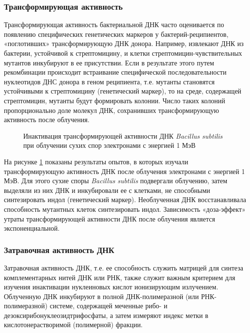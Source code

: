 \documentclass[a4paper, 14pt]{article}
\begin{document}
\subsubsection{Трансформирующая активность}
Трансформирующая активность бактериальной ДНК часто оценивается по
появлению специфических генетических маркеров у бактерий-реципиентов,
«поглотивших» трансформирующую ДНК донора. Например, извлекают ДНК из
бактерии, устойчивой к стрептомицину, и клетки стрептомицин-чувствительных
мутантов инкубируют в ее присутствии. Если в результате этого путем рекомбинации
происходит встраивание специфической последовательности нуклеотидов ДНС
донора в геном реципиента, т.е. мутанты становятся устойчивыми к стрептомицину
(генетический маркер), то на среде, содержащей стрептомицин, мутанты будут
формировать колонии. Число таких колоний пропорционально доле молекул ДНК,
сохранивших трансформирующую активность после облучения.
\begin{figure}[htbp]
    \centering
    \caption{Инактивация трансформирующей активности ДНК \textit{Bacillus subtilis} при облучении сухих спор электронами с энергией 1 МэВ}
    \label{transformativeActivity}
\end{figure}

На рисунке \ref{transformativeActivity} показаны результаты опытов, в которых изучали трансформирующую активность ДНК после облучения электронами с энергией 1 МэВ. Для этого сухие споры \textit{Bacillus subtilis} подвергали облучению, затем выделяли из них ДНК и инкубировали ее с клетками, не способными синтезировать индол (генетический маркер). Необлученная ДНК восстанавливала способность мутантных клеток синтезировать индол. Зависимость «доза-эффект» утраты трансформирующей активности ДНК после облучения является экспоненциальной.

\subsubsection{Затравочная активность ДНК}
Затравочная активность ДНК, т.е. ее способность служить матрицей для синтеза
комплементарных нитей ДНК или РНК, также служит важным критерием для
изучения инактивации нуклеиновых кислот ионизирующим излучением. Облученную
ДНК инкубируют в полной ДНК-полимеразной (или РНК-полимеразной) системе,
содержащей меченные рибо- и дезоксирибонуклеозидтрифосфаты, а затем измеряют
индекс метки в кислотонерастворимой (полимерной) фракции.
\end{document}
